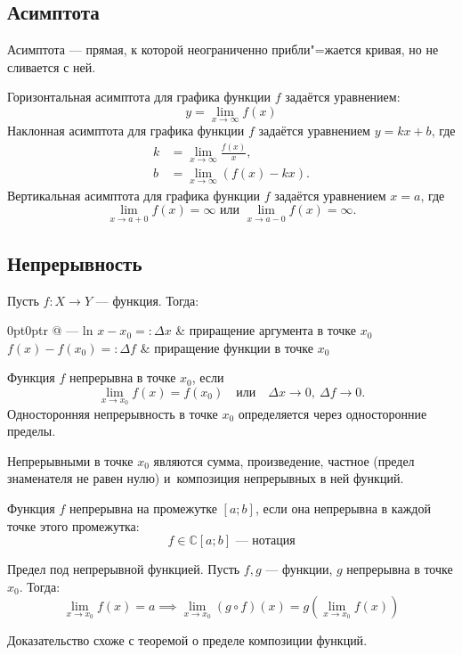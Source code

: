 \subsection{Асимптота}

{\bold Асимптота} --- прямая, к которой {\ital неограниченно} прибли"=жается кривая, но не сливается с ней.

{\ital Горизонтальная асимптота} для графика функции $f$ задаётся уравнением:
$$y=\lim_{x\to\infty}f(x)$$
{\ital Наклонная асимптота} для графика функции $f$ задаётся уравнением $y=kx+b$, где
\begin{align*}
k&=\lim_{x\to\infty}\frac{f(x)}{x},\\
b&=\lim_{x\to\infty}(f(x)-kx).
\end{align*}
{\ital Вертикальная асимптота} для графика функции $f$ задаётся уравнением $x=a$, где
$$\lim_{x\to a+0}f(x)=\infty\text{ или }\lim_{x\to a-0}f(x)=\infty.$$

\subsection{Непрерывность}

Пусть $f\colon X\to Y$ --- функция. Тогда:

\begin{tabularc}{0pt}{0pt}{r @{ --- } l}{n}
$x-x_0=:\Delta x$ & {\ital приращение аргумента} в точке $x_0$\\
$f(x)-f(x_0)=:\Delta f$ & {\ital приращение функции} в точке $x_0$
\end{tabularc}

Функция $f$ {\bold непрерывна} {\ital в точке} $x_0$, если
$$\lim_{x\to x_0}f(x)=f(x_0)\quad\text{или}\quad\Delta x\to 0,\ \Delta f\to 0.$$
{\bold Односторонняя непрерывность} в точке $x_0$ определяется через односторонние пределы.

Непрерывными в точке $x_0$ являются {\ital сумма}, {\ital произведение}, {\ital частное {\color{desc}(предел знаменателя не равен нулю)}} и~{\ital композиция} непрерывных в ней функций.

Функция $f$ {\bold непрерывна} {\ital на промежутке} $[a;b]$, если она непрерывна в каждой точке этого промежутка:
$$f\in\mathbb{C}[a;b]\text{ --- нотация}$$
\begin{theorem}
{\bold Предел под непрерывной функцией.} Пусть $f,g$ --- функции, $g$ непрерывна в точке $x_0$. Тогда:
$$\lim_{x\to x_0}f(x)=a\implies\lim_{x\to x_0}(g\circ f)(x)=g(\lim_{x\to x_0}f(x))$$
\end{theorem}
Доказательство схоже с теоремой о пределе {\ital композиции функций}.

